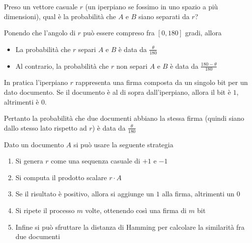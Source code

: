       Preso un vettore casuale $r$ (un iperpiano se fossimo in uno spazio a più dimensioni), qual è la probabilità che $A$ e $B$ siano separati da $r$?

      Ponendo che l'angolo di $r$ può essere compreso fra $[0, 180]$ gradi, allora
      \begin{itemize}
        \item La probabilità che $r$ separi $A$ e $B$ è data da $\frac{\theta}{180}$
        \item Al contrario, la probabilità che $r$ non separi $A$ e $B$ è data da $\frac{180 - \theta}{180}$
      \end{itemize}

      \begin{remark}
        In pratica l'iperpiano $r$ rappresenta una firma composta da un singolo bit per un dato documento. Se il documento è al di sopra dall'iperpiano, allora il bit è $1$, altrimenti è $0$.
      \end{remark}

      Pertanto la probabilità che due documenti abbiano la stessa firma (quindi siano dallo stesso lato rispetto ad $r$) è data da
      $ \frac{\theta}{180} $

      \begin{remark}
        Dato un documento $A$ si può usare la seguente strategia
        \begin{enumerate}
          \item Si genera $r$ come una sequenza casuale di $+1$ e $-1$
          \item Si computa il prodotto scalare $r \cdot A$
          \item Se il risultato è positivo, allora si aggiunge un $1$ alla firma, altrimenti un $0$
          \item Si ripete il processo $m$ volte, ottenendo così una firma di $m$ bit
          \item Infine si può sfruttare la distanza di Hamming per calcolare la similarità fra due documenti
        \end{enumerate}
      \end{remark}

